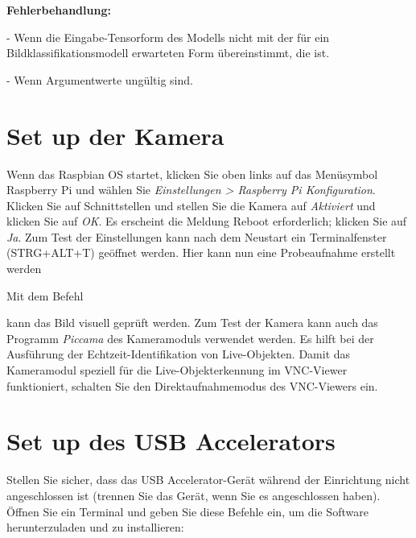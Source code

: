\textbf{Fehlerbehandlung:}


 - Wenn die Eingabe-Tensorform des Modells nicht mit der für ein Bildklassifikationsmodell erwarteten Form übereinstimmt, die  ist.

 - Wenn Argumentwerte ungültig sind.




\section{Set up der Kamera}


Wenn das Raspbian OS startet, klicken Sie oben links auf das Menüsymbol Raspberry Pi und wählen Sie \textsl{Einstellungen > Raspberry Pi Konfiguration}.
Klicken Sie auf Schnittstellen und stellen Sie die Kamera auf \textsl{Aktiviert} und klicken Sie auf \textsl{OK}. Es erscheint die Meldung \glqq Reboot erforderlich\grqq; klicken Sie auf \textsl{Ja}.
Zum Test der Einstellungen kann nach dem Neustart ein Terminalfenster (STRG+ALT+T)
geöffnet werden. Hier kann nun eine Probeaufnahme erstellt werden

\medskip


\medskip

Mit dem Befehl

\medskip


\medskip


kann das Bild visuell geprüft werden.
Zum Test der Kamera kann auch das Programm \textsl{Piccama}
des Kameramoduls verwendet werden. Es hilft bei der Ausführung der
Echtzeit-Identifikation von Live-Objekten.
Damit das Kameramodul speziell für die Live-Objekterkennung im VNC-Viewer funktioniert, schalten Sie den Direktaufnahmemodus des VNC-Viewers ein.



\section{Set up des USB Accelerators}

Stellen Sie sicher, dass das USB Accelerator-Gerät während der Einrichtung nicht angeschlossen ist (trennen Sie das Gerät, wenn Sie es angeschlossen haben). Öffnen Sie ein Terminal und geben Sie diese Befehle ein, um die Software herunterzuladen und zu installieren:

